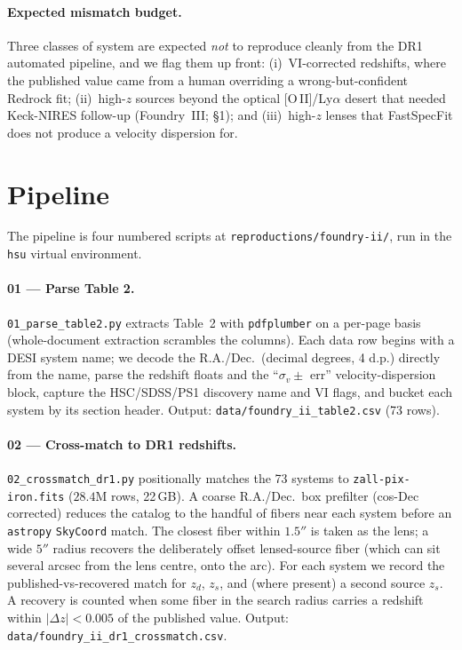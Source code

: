 \documentclass[11pt,letterpaper]{article}
\newcommand{\sigmav}{\ensuremath{\sigma_v}}
\newcommand{\zd}{\ensuremath{z_d}}
\newcommand{\zs}{\ensuremath{z_s}}
\newcommand{\dz}{\ensuremath{\Delta z}}
\begin{document}
\paragraph{Expected mismatch budget.}
Three classes of system are expected \emph{not} to reproduce cleanly from the
DR1 automated pipeline, and we flag them up front: (i)~VI-corrected redshifts,
where the published value came from a human overriding a wrong-but-confident
Redrock fit; (ii)~high-$z$ sources beyond the optical [O\,II]/Ly$\alpha$ desert
that needed Keck-NIRES follow-up (Foundry~III; \citealt{huang2025foundry2}
\S1); and (iii)~high-$z$ lenses that FastSpecFit does not produce a velocity
dispersion for.

\section{Pipeline}

The pipeline is four numbered scripts at
\texttt{reproductions/foundry-ii/}, run in the \texttt{hsu} virtual
environment.

\paragraph{01 --- Parse Table 2.}
\texttt{01\_parse\_table2.py} extracts Table~2 with \texttt{pdfplumber}
\autocite{pdfplumber} on a per-page basis (whole-document extraction scrambles
the columns). Each data row begins with a DESI system name; we decode the
R.A./Dec.\ (decimal degrees, 4 d.p.) directly from the name, parse the redshift
floats and the ``$\sigmav \pm$ err'' velocity-dispersion block, capture the
HSC/SDSS/PS1 discovery name and VI flags, and bucket each system by its section
header. Output: \texttt{data/foundry\_ii\_table2.csv} (73 rows).

\paragraph{02 --- Cross-match to DR1 redshifts.}
\texttt{02\_crossmatch\_dr1.py} positionally matches the 73 systems to
\texttt{zall-pix-iron.fits} ($28.4$M rows, 22\,GB). A coarse R.A./Dec.\ box
prefilter (cos-Dec corrected) reduces the catalog to the handful of fibers near
each system before an \texttt{astropy} \texttt{SkyCoord} match. The closest
fiber within $1.5''$ is taken as the lens; a wide $5''$ radius recovers the
deliberately offset lensed-source fiber (which can sit several arcsec from the
lens centre, onto the arc). For each system we record the published-vs-recovered
match for \zd, \zs, and (where present) a second source \zs.
A recovery is counted when some fiber in the search radius carries a redshift
within $|\dz|<0.005$ of the published value. Output:
\texttt{data/foundry\_ii\_dr1\_crossmatch.csv}.
\end{document}
